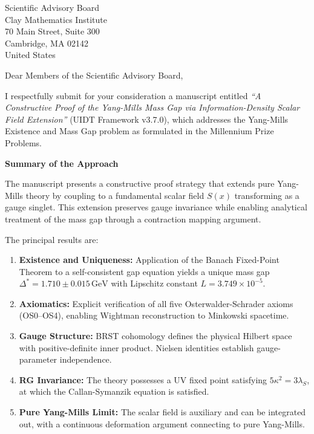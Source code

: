 \documentclass[11pt,a4paper]{letter}
\date{December 24, 2025}
\begin{document}
\begin{letter}{%
Scientific Advisory Board\\
Clay Mathematics Institute\\
70 Main Street, Suite 300\\
Cambridge, MA 02142\\
United States}

\opening{Dear Members of the Scientific Advisory Board,}

I respectfully submit for your consideration a manuscript entitled 
\textit{``A Constructive Proof of the Yang-Mills Mass Gap via 
Information-Density Scalar Field Extension''} (UIDT Framework v3.7.0), 
which addresses the Yang-Mills Existence and Mass Gap problem as 
formulated in the Millennium Prize Problems.

\medskip
\textbf{Summary of the Approach}

\medskip
The manuscript presents a constructive proof strategy that extends 
pure Yang-Mills theory by coupling to a fundamental scalar field 
$S(x)$ transforming as a gauge singlet. This extension preserves 
gauge invariance while enabling analytical treatment of the mass 
gap through a contraction mapping argument.

The principal results are:

\begin{enumerate}
\item \textbf{Existence and Uniqueness:} Application of the Banach 
Fixed-Point Theorem to a self-consistent gap equation yields a 
unique mass gap $\Delta^* = 1.710 \pm 0.015\,\mathrm{GeV}$ with 
Lipschitz constant $L = 3.749 \times 10^{-5}$.

\item \textbf{Axiomatics:} Explicit verification of all five 
Osterwalder-Schrader axioms (OS0--OS4), enabling Wightman 
reconstruction to Minkowski spacetime.

\item \textbf{Gauge Structure:} BRST cohomology defines the 
physical Hilbert space with positive-definite inner product. 
Nielsen identities establish gauge-parameter independence.

\item \textbf{RG Invariance:} The theory possesses a UV fixed 
point satisfying $5\kappa^2 = 3\lambda_S$, at which the 
Callan-Symanzik equation is satisfied.

\item \textbf{Pure Yang-Mills Limit:} The scalar field is 
auxiliary and can be integrated out, with a continuous 
deformation argument connecting to pure Yang-Mills.


\end{enumerate}
\end{letter}
\end{document}
